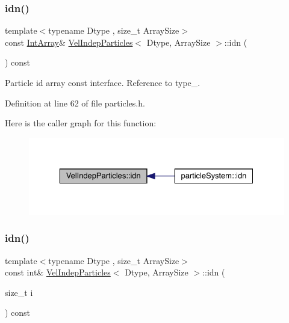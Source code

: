 \subsubsection{\texorpdfstring{idn()}{idn()}\hspace{0.1cm}{\footnotesize\ttfamily [1/2]}}
{\footnotesize\ttfamily template$<$typename Dtype , size\+\_\+t Array\+Size$>$ \\
const \mbox{\hyperlink{class_vel_indep_particles_a5e4f20d435c71a5f4179143206258a81}{Int\+Array}}\& \mbox{\hyperlink{class_vel_indep_particles}{Vel\+Indep\+Particles}}$<$ Dtype, Array\+Size $>$\+::idn (\begin{DoxyParamCaption}{ }\end{DoxyParamCaption}) const\hspace{0.3cm}{\ttfamily [inline]}}



Particle id array const interface. Reference to type\+\_\+. 



Definition at line 62 of file particles.\+h.

Here is the caller graph for this function\+:\nopagebreak
\begin{figure}[H]
\begin{center}
\leavevmode
\includegraphics[width=329pt]{class_vel_indep_particles_a5b43130b3d3a94f5e2336e4e0ca78cf4_icgraph}
\end{center}
\end{figure}
\mbox{\label{class_vel_indep_particles_a9ab4c300244e1085dcfc73713354060c}} 
\subsubsection{\texorpdfstring{idn()}{idn()}\hspace{0.1cm}{\footnotesize\ttfamily [2/2]}}
{\footnotesize\ttfamily template$<$typename Dtype , size\+\_\+t Array\+Size$>$ \\
const int\& \mbox{\hyperlink{class_vel_indep_particles}{Vel\+Indep\+Particles}}$<$ Dtype, Array\+Size $>$\+::idn (\begin{DoxyParamCaption}\item[{size\+\_\+t}]{i }\end{DoxyParamCaption}) const\hspace{0.3cm}{\ttfamily [inline]}}



